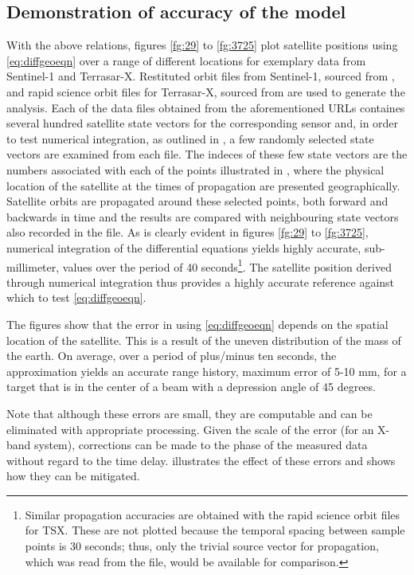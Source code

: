 \subsection{Demonstration of accuracy of the model}
With the above relations, figures \ref{fg:29} to \ref{fg:3725} plot satellite positions using \eqref{eq:diffgeoeqn} over a range of different locations for exemplary data from Sentinel-1 and Terrasar-X. Restituted orbit files from Sentinel-1, sourced from \cite{SentinelPOD}, and rapid science orbit files for Terrasar-X, sourced from \cite{GFZ} are used to generate the analysis. Each of the data files obtained from the aforementioned URLs containes several hundred satellite state vectors for the corresponding sensor and, in order to test numerical integration, as outlined in , a few randomly selected state vectors are examined from each file. The indeces of these few state vectors are the numbers associated with each of the points illustrated in , where the physical location of the satellite at the times of propagation are presented geographically. Satellite orbits are propagated around these selected points, both forward and backwards in time and the results are compared with neighbouring state vectors also recorded in the file. As is clearly evident in figures \ref{fg:29} to \ref{fg:3725}, numerical integration of the differential equations yields highly accurate, sub-millimeter, values over the period of 40 seconds\footnote{Similar propagation accuracies are obtained with the rapid science orbit files for TSX. These are not plotted because the temporal spacing between sample points is 30 seconds; thus, only the trivial source vector for propagation, which was read from the file, would be available for comparison.}. The satellite position derived through numerical integration thus provides a highly accurate reference against which to test \eqref{eq:diffgeoeqn}. 
\par
The figures show that the error in using \eqref{eq:diffgeoeqn} depends on the spatial location of the satellite. This is a result of the uneven distribution of the mass of the earth. On average, over a period of plus/minus ten seconds, the approximation yields an accurate range history, maximum error of 5-10 mm, for a target that is in the center of a beam with a depression angle of 45 degrees. 
\par
Note that although these errors are small, they are computable and can be eliminated with appropriate processing. Given the scale of the error (for an X-band system), corrections can be made to the phase of the measured data without regard to the time delay.   illustrates the effect of these errors and shows how they can be mitigated.  
